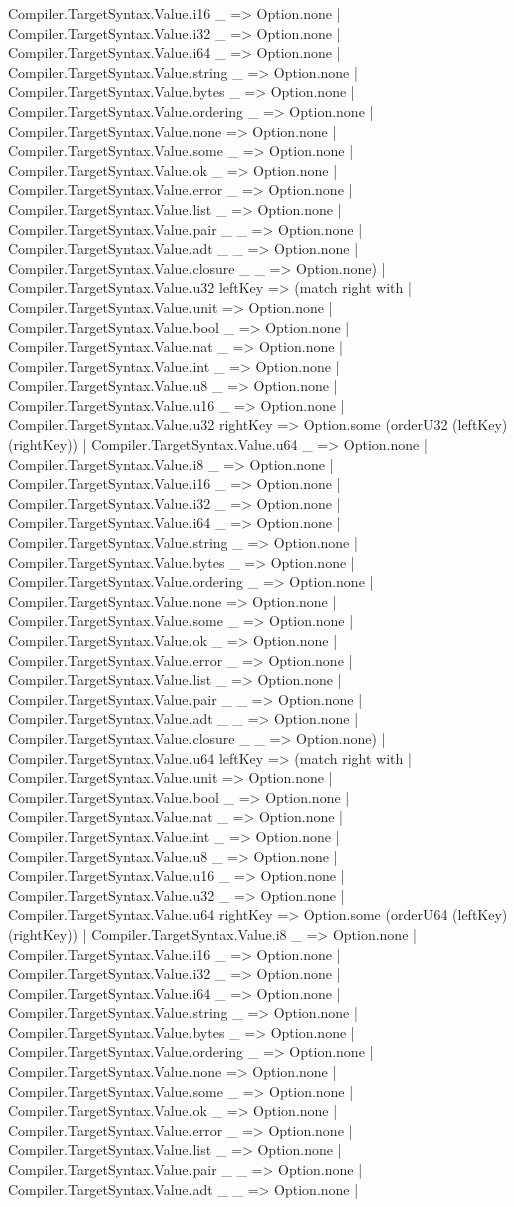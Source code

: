 \documentclass[11pt]{article}
\begin{document}
Compiler.TargetSyntax.Value.i16 \_ => Option.none | Compiler.TargetSyntax.Value.i32 \_ => Option.none | Compiler.TargetSyntax.Value.i64 \_ => Option.none | Compiler.TargetSyntax.Value.string \_ => Option.none | Compiler.TargetSyntax.Value.bytes \_ => Option.none | Compiler.TargetSyntax.Value.ordering \_ => Option.none | Compiler.TargetSyntax.Value.none => Option.none | Compiler.TargetSyntax.Value.some \_ => Option.none | Compiler.TargetSyntax.Value.ok \_ => Option.none | Compiler.TargetSyntax.Value.error \_ => Option.none | Compiler.TargetSyntax.Value.list \_ => Option.none | Compiler.TargetSyntax.Value.pair \_ \_ => Option.none | Compiler.TargetSyntax.Value.adt \_ \_ => Option.none | Compiler.TargetSyntax.Value.closure \_ \_ => Option.none) | Compiler.TargetSyntax.Value.u32 leftKey => (match right with | Compiler.TargetSyntax.Value.unit => Option.none | Compiler.TargetSyntax.Value.bool \_ => Option.none | Compiler.TargetSyntax.Value.nat \_ => Option.none | Compiler.TargetSyntax.Value.int \_ => Option.none | Compiler.TargetSyntax.Value.u8 \_ => Option.none | Compiler.TargetSyntax.Value.u16 \_ => Option.none | Compiler.TargetSyntax.Value.u32 rightKey => Option.some (orderU32 (leftKey) (rightKey)) | Compiler.TargetSyntax.Value.u64 \_ => Option.none | Compiler.TargetSyntax.Value.i8 \_ => Option.none | Compiler.TargetSyntax.Value.i16 \_ => Option.none | Compiler.TargetSyntax.Value.i32 \_ => Option.none | Compiler.TargetSyntax.Value.i64 \_ => Option.none | Compiler.TargetSyntax.Value.string \_ => Option.none | Compiler.TargetSyntax.Value.bytes \_ => Option.none | Compiler.TargetSyntax.Value.ordering \_ => Option.none | Compiler.TargetSyntax.Value.none => Option.none | Compiler.TargetSyntax.Value.some \_ => Option.none | Compiler.TargetSyntax.Value.ok \_ => Option.none | Compiler.TargetSyntax.Value.error \_ => Option.none | Compiler.TargetSyntax.Value.list \_ => Option.none | Compiler.TargetSyntax.Value.pair \_ \_ => Option.none | Compiler.TargetSyntax.Value.adt \_ \_ => Option.none | Compiler.TargetSyntax.Value.closure \_ \_ => Option.none) | Compiler.TargetSyntax.Value.u64 leftKey => (match right with | Compiler.TargetSyntax.Value.unit => Option.none | Compiler.TargetSyntax.Value.bool \_ => Option.none | Compiler.TargetSyntax.Value.nat \_ => Option.none | Compiler.TargetSyntax.Value.int \_ => Option.none | Compiler.TargetSyntax.Value.u8 \_ => Option.none | Compiler.TargetSyntax.Value.u16 \_ => Option.none | Compiler.TargetSyntax.Value.u32 \_ => Option.none | Compiler.TargetSyntax.Value.u64 rightKey => Option.some (orderU64 (leftKey) (rightKey)) | Compiler.TargetSyntax.Value.i8 \_ => Option.none | Compiler.TargetSyntax.Value.i16 \_ => Option.none | Compiler.TargetSyntax.Value.i32 \_ => Option.none | Compiler.TargetSyntax.Value.i64 \_ => Option.none | Compiler.TargetSyntax.Value.string \_ => Option.none | Compiler.TargetSyntax.Value.bytes \_ => Option.none | Compiler.TargetSyntax.Value.ordering \_ => Option.none | Compiler.TargetSyntax.Value.none => Option.none | Compiler.TargetSyntax.Value.some \_ => Option.none | Compiler.TargetSyntax.Value.ok \_ => Option.none | Compiler.TargetSyntax.Value.error \_ => Option.none | Compiler.TargetSyntax.Value.list \_ => Option.none | Compiler.TargetSyntax.Value.pair \_ \_ => Option.none | Compiler.TargetSyntax.Value.adt \_ \_ => Option.none | 
\end{document}

